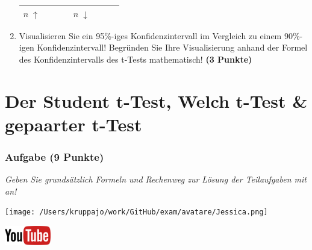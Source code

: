 \documentclass[a4paper, 9pt]{scrartcl}\usepackage[]{graphicx}\usepackage[]{xcolor}
\begin{document}
\begin{enumerate}
\begin{center}
\begin{tabular}[c]{l|c|c|c|l|c|c|c}
    \hline
        \textbf{$n\; \uparrow$} & \hspace{1.8cm} & \hspace{1.8cm}  & \hspace{1.8cm} & \textbf{
                                                          $n\; \downarrow$} &
                                                                          \hspace{1.8cm}
                                                & \hspace{1.8cm}  & \hspace{1.8cm}\strut\\
    \hline
  \end{tabular}
\end{center}
\item Visualisieren Sie ein 95\%-iges Konfidenzintervall im Vergleich
  zu einem 90\%-igen Konfidenzintervall! Begr{\"u}nden Sie Ihre Visualisierung anhand der Formel
  des Konfidenzintervalls des t-Tests mathematisch! \textbf{(3 Punkte)} 
\end{enumerate} 
\clearpage
\part{Der Student t-Test, Welch t-Test \& gepaarter t-Test}

\section{Aufgabe \hfill (9 Punkte)}

\textit{Geben Sie grundsätzlich Formeln und Rechenweg zur Lösung der Teilaufgaben mit an!} \\[1Ex]
 

 
\begin{minipage}[t]{0.5\textwidth}
\texttt{[image: /Users/kruppajo/work/GitHub/exam/avatare/Jessica.png]}
\end{minipage}
\begin{minipage}[t]{0.5\textwidth}
\hfill
\href{https://youtu.be/eejS2uG4o-M}{\includegraphics[width = 2cm]{img/youtube}}\\[1Ex]
\end{minipage}
\vspace{1ex}
\end{document}
